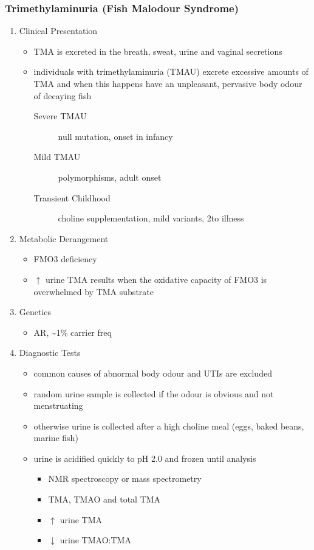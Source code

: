 \documentclass{scrartcl}
\begin{document}
\subsubsection{Trimethylaminuria (Fish Malodour Syndrome)}
\label{sec:org2f527ea}
\begin{enumerate}
\item Clinical Presentation
\label{sec:org5349d89}
\begin{itemize}
\item TMA is excreted in the breath, sweat, urine and vaginal secretions
\item individuals with trimethylaminuria (TMAU) excrete excessive amounts
of TMA and when this happens have an unpleasant, pervasive body
odour of decaying fish
\begin{description}
\item[{Severe TMAU}] null mutation, onset in infancy
\item[{Mild TMAU}] polymorphisms, adult onset
\item[{Transient Childhood}] choline supplementation, mild variants, 2\degree to illness
\end{description}
\end{itemize}

\item Metabolic Derangement
\label{sec:org34587d2}
\begin{itemize}
\item FMO3 deficiency
\item \(\uparrow\) urine TMA results when the oxidative capacity of FMO3 is
overwhelmed by TMA substrate
\end{itemize}

\item Genetics
\label{sec:org9f45141}
\begin{itemize}
\item AR, \textasciitilde{}1\% carrier freq
\end{itemize}

\item Diagnostic Tests
\label{sec:org5ee1a15}
\begin{itemize}
\item common causes of abnormal body odour and UTIs are excluded
\item random urine sample is collected if the odour is obvious and not
menstruating
\item otherwise urine is collected after a high choline meal (eggs, baked
beans, marine fish)
\item urine is acidified quickly to pH 2.0 and frozen until analysis
\begin{itemize}
\item NMR spectroscopy or mass spectrometry
\item TMA, TMAO and total TMA
\item \(\uparrow\) urine TMA
\item \(\downarrow\) urine TMAO:TMA
\end{itemize}
\end{itemize}


\end{enumerate}
\end{document}
